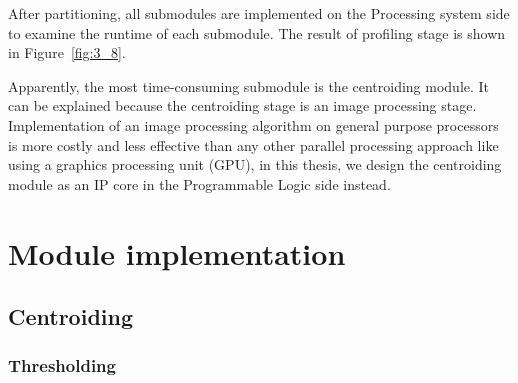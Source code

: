 \noindent After partitioning, all submodules are implemented on the Processing system side to examine the runtime of each submodule. The result of profiling stage is shown in Figure~\ref{fig:3_8}. \\




\noindent Apparently, the most time-consuming submodule is the centroiding module. It can be explained because the centroiding stage is an image processing stage. Implementation of an image processing algorithm on general purpose processors is more costly and less effective than any other parallel processing approach like using a graphics processing unit (GPU), in this thesis, we design the centroiding module as an IP core in the Programmable Logic side instead.

\section{Module implementation}

\subsection{Centroiding}

\subsubsection{Thresholding}

